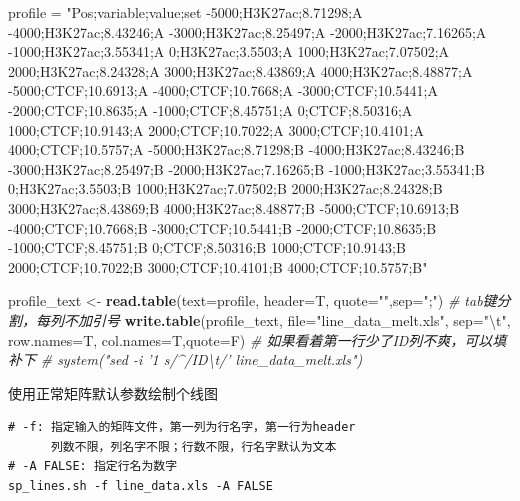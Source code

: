 \documentclass[]{article}
\newenvironment{Shaded}{\begin{snugshade}}{\end{snugshade}}
\newcommand{\KeywordTok}[1]{\textcolor[rgb]{0.13,0.29,0.53}{\textbf{{#1}}}}
\newcommand{\DataTypeTok}[1]{\textcolor[rgb]{0.13,0.29,0.53}{{#1}}}
\newcommand{\CharTok}[1]{\textcolor[rgb]{0.31,0.60,0.02}{{#1}}}
\newcommand{\StringTok}[1]{\textcolor[rgb]{0.31,0.60,0.02}{{#1}}}
\newcommand{\CommentTok}[1]{\textcolor[rgb]{0.56,0.35,0.01}{\textit{{#1}}}}
\newcommand{\NormalTok}[1]{{#1}}
\numberwithin{figure}{section}
\numberwithin{table}{section}
\theoremstyle{definition}
\theoremstyle{definition}
\theoremstyle{definition}
\theoremstyle{remark}
\begin{document}
\begin{Shaded}
\begin{Highlighting}[]
\NormalTok{profile =}\StringTok{ "Pos;variable;value;set}
\StringTok{-5000;H3K27ac;8.71298;A}
\StringTok{-4000;H3K27ac;8.43246;A}
\StringTok{-3000;H3K27ac;8.25497;A}
\StringTok{-2000;H3K27ac;7.16265;A}
\StringTok{-1000;H3K27ac;3.55341;A}
\StringTok{0;H3K27ac;3.5503;A}
\StringTok{1000;H3K27ac;7.07502;A}
\StringTok{2000;H3K27ac;8.24328;A}
\StringTok{3000;H3K27ac;8.43869;A}
\StringTok{4000;H3K27ac;8.48877;A}
\StringTok{-5000;CTCF;10.6913;A}
\StringTok{-4000;CTCF;10.7668;A}
\StringTok{-3000;CTCF;10.5441;A}
\StringTok{-2000;CTCF;10.8635;A}
\StringTok{-1000;CTCF;8.45751;A}
\StringTok{0;CTCF;8.50316;A}
\StringTok{1000;CTCF;10.9143;A}
\StringTok{2000;CTCF;10.7022;A}
\StringTok{3000;CTCF;10.4101;A}
\StringTok{4000;CTCF;10.5757;A}
\StringTok{-5000;H3K27ac;8.71298;B}
\StringTok{-4000;H3K27ac;8.43246;B}
\StringTok{-3000;H3K27ac;8.25497;B}
\StringTok{-2000;H3K27ac;7.16265;B}
\StringTok{-1000;H3K27ac;3.55341;B}
\StringTok{0;H3K27ac;3.5503;B}
\StringTok{1000;H3K27ac;7.07502;B}
\StringTok{2000;H3K27ac;8.24328;B}
\StringTok{3000;H3K27ac;8.43869;B}
\StringTok{4000;H3K27ac;8.48877;B}
\StringTok{-5000;CTCF;10.6913;B}
\StringTok{-4000;CTCF;10.7668;B}
\StringTok{-3000;CTCF;10.5441;B}
\StringTok{-2000;CTCF;10.8635;B}
\StringTok{-1000;CTCF;8.45751;B}
\StringTok{0;CTCF;8.50316;B}
\StringTok{1000;CTCF;10.9143;B}
\StringTok{2000;CTCF;10.7022;B}
\StringTok{3000;CTCF;10.4101;B}
\StringTok{4000;CTCF;10.5757;B"}

\NormalTok{profile_text <-}\StringTok{ }\KeywordTok{read.table}\NormalTok{(}\DataTypeTok{text=}\NormalTok{profile, }\DataTypeTok{header=}\NormalTok{T, }\DataTypeTok{quote=}\StringTok{""}\NormalTok{,}\DataTypeTok{sep=}\StringTok{";"}\NormalTok{)}
\CommentTok{# tab键分割，每列不加引号}
\KeywordTok{write.table}\NormalTok{(profile_text, }\DataTypeTok{file=}\StringTok{"line_data_melt.xls"}\NormalTok{, }\DataTypeTok{sep=}\StringTok{"}\CharTok{\textbackslash{}t}\StringTok{"}\NormalTok{, }\DataTypeTok{row.names=}\NormalTok{T, }\DataTypeTok{col.names=}\NormalTok{T,}\DataTypeTok{quote=}\NormalTok{F)}
\CommentTok{# 如果看着第一行少了ID列不爽，可以填补下}
\CommentTok{# system("sed -i '1 s/^/ID\textbackslash{}t/' line_data_melt.xls")}
\end{Highlighting}
\end{Shaded}

使用正常矩阵默认参数绘制个线图

\begin{verbatim}
# -f: 指定输入的矩阵文件，第一列为行名字，第一行为header
      列数不限，列名字不限；行数不限，行名字默认为文本
# -A FALSE: 指定行名为数字
sp_lines.sh -f line_data.xls -A FALSE
\end{verbatim}
\end{document}
